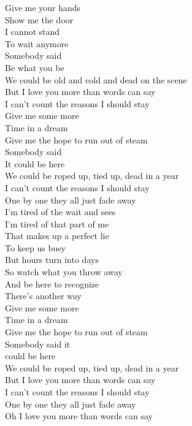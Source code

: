 \documentclass{article}
\begin{document}
Give me your hands\\
Show me the door\\
I cannot stand\\
To wait anymore\\
Somebody said\\
Be what you be\\
We could be old and cold and dead on the scene\\

But I love you more than words can say\\
I can't count the reasons I should stay\\

Give me some more\\
Time in a dream\\
Give me the hope to run out of steam\\
Somebody said\\
It could be here\\
We could be roped up, tied up, dead in a year\\

I can't count the reasons I should stay\\
One by one they all just fade away\\

I'm tired of the wait and sees\\
I'm tired of that part of me\\
That makes up a perfect lie\\
To keep us busy\\
But hours turn into days\\
So watch what you throw away\\
And be here to recognize\\
There's another way\\

Give me some more\\
Time in a dream\\
Give me the hope to run out of steam\\
Somebody said it\\
could be here\\
We could be roped up, tied up, dead in a year\\

But I love you more than words can say\\
I can't count the reasons I should stay\\
One by one they all just fade away\\
Oh I love you more than words can say\\
\end{document}
